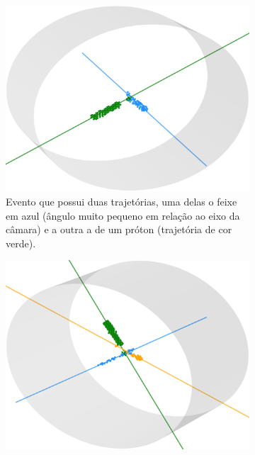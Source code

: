 \documentclass[a4paper,12pt,oneside]{book}
\begin{document}
\begin{figure}[H]
\centering
    \begin{subfigure}[t]{0.45\textwidth}
        \centering
        \includegraphics[scale=0.5, width=.95\columnwidth]{figs/exemplo_track_2.png}
        \caption{Evento que possui duas trajetórias, uma delas o feixe em azul (ângulo muito pequeno em relação ao eixo da câmara) e a outra a de um próton (trajetória de cor verde).}
        \label{subfig:exemplo_track_proton_16O}
    \end{subfigure}%
    \hspace{0.5cm}
    \begin{subfigure}[t]{0.45\textwidth}
        \centering
        \includegraphics[scale=0.5, width=.95\columnwidth]{figs/exemplo_track_4.png}

\end{subfigure}
\end{figure}
\end{document}
